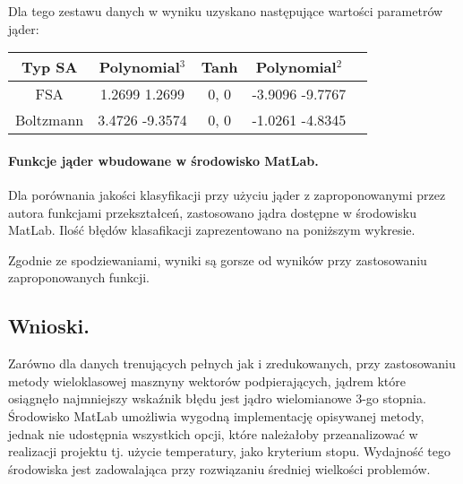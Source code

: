 \documentclass{article}
\begin{document}
Dla tego zestawu danych w wyniku uzyskano następujące wartości parametrów jąder:

\begin{center}
    \begin{tabular}{ | c | c | c | c | c | }
    \hline
    Typ SA & \textbf{Polynomial}$^{3}$ & \textbf{Tanh} & \textbf{Polynomial$^{2}$} \\ \hline
    FSA & 1.2699 1.2699 & 0, 0 & -3.9096 -9.7767 \\ \hline
	Boltzmann & 3.4726 -9.3574 & 0, 0 & -1.0261 -4.8345 \\ \hline
    \end{tabular}
\end{center}

\paragraph {Funkcje jąder wbudowane w środowisko MatLab.} Dla porównania jakości klasyfikacji przy użyciu jąder z zaproponowanymi przez autora funkcjami przekształceń, zastosowano jądra dostępne w środowisku MatLab. Ilość błędów klasafikacji zaprezentowano na poniższym wykresie.
\pgfplotsset{width=6cm,compat=1.4}
\begin{center}
\end{center}

Zgodnie ze spodziewaniami, wyniki są gorsze od wyników przy zastosowaniu zaproponowanych funkcji.

\subsection{Wnioski.}
Zarówno dla danych trenujących pełnych jak i zredukowanych, przy zastosowaniu metody wieloklasowej 
masznyny wektorów podpierających, jądrem które osiągnęło najmniejszy wskaźnik błędu jest jądro wielomianowe
3-go stopnia.\linebreak
Środowisko MatLab umożliwia wygodną implementację opisywanej metody, jednak nie udostępnia wszystkich opcji, które
należałoby przeanalizować w realizacji projektu tj. użycie temperatury, jako kryterium stopu. Wydajność tego środowiska jest zadowalająca przy rozwiązaniu średniej wielkości problemów.
\end{document}
